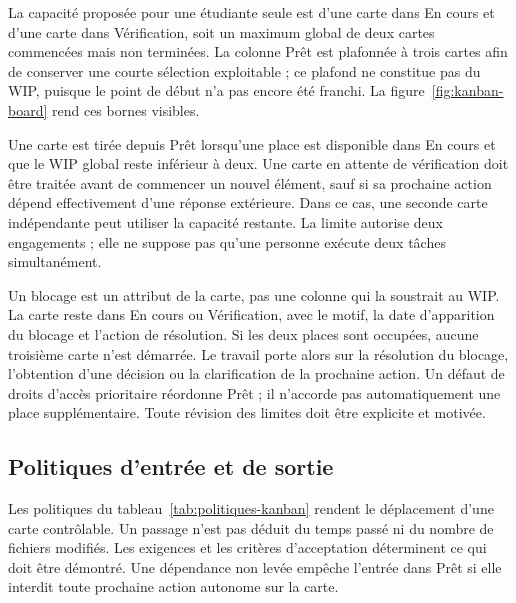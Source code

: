 La capacité proposée pour une étudiante seule est d'une carte dans En cours et d'une carte dans Vérification, soit un maximum global de deux cartes commencées mais non terminées. La colonne Prêt est plafonnée à trois cartes afin de conserver une courte sélection exploitable ; ce plafond ne constitue pas du WIP, puisque le point de début n'a pas encore été franchi. La figure~\ref{fig:kanban-board} rend ces bornes visibles.

Une carte est tirée depuis Prêt lorsqu'une place est disponible dans En cours et que le WIP global reste inférieur à deux. Une carte en attente de vérification doit être traitée avant de commencer un nouvel élément, sauf si sa prochaine action dépend effectivement d'une réponse extérieure. Dans ce cas, une seconde carte indépendante peut utiliser la capacité restante. La limite autorise deux engagements ; elle ne suppose pas qu'une personne exécute deux tâches simultanément.

Un blocage est un attribut de la carte, pas une colonne qui la soustrait au WIP. La carte reste dans En cours ou Vérification, avec le motif, la date d'apparition du blocage et l'action de résolution. Si les deux places sont occupées, aucune troisième carte n'est démarrée. Le travail porte alors sur la résolution du blocage, l'obtention d'une décision ou la clarification de la prochaine action. Un défaut de droits d'accès prioritaire réordonne Prêt ; il n'accorde pas automatiquement une place supplémentaire. Toute révision des limites doit être explicite et motivée.

\subsection{Politiques d'entrée et de sortie}

Les politiques du tableau~\ref{tab:politiques-kanban} rendent le déplacement d'une carte contrôlable. Un passage n'est pas déduit du temps passé ni du nombre de fichiers modifiés. Les exigences et les critères d'acceptation déterminent ce qui doit être démontré. Une dépendance non levée empêche l'entrée dans Prêt si elle interdit toute prochaine action autonome sur la carte.

